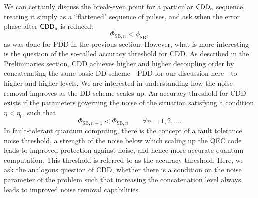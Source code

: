 \documentclass[b5paper,11pt]{article}
\newcommand{\CDDn}{\textsf{CDD\textsubscript{n}}}
\begin{document}



We can certainly discuss the break-even point for a particular $\CDDn$ sequence, treating it simply as a ``flattened" sequence of pulses, and ask when the error phase after $\CDDn$ is reduced:
\begin{equation}
 \Phi_{\mathrm{SB},n} < \phi_{\mathrm{SB}},
\end{equation}
 as was done for PDD in the previous section. 
However, what is more interesting is the question of the so-called accuracy threshold for CDD.
As described in the Preliminaries section, CDD achieves higher and higher decoupling order by concatenating the same basic DD scheme---PDD for our discussion here---to higher and higher levels. 
We are interested in understanding how the noise removal improves as the DD scheme scales up.  An accuracy threshold for CDD exists if the parameters governing the noise of the situation satisfying a condition $\eta<\eta_0$, such that 
\begin{equation}\label{eq:thresCond}
\Phi_{\mathrm{SB},n+1} < \Phi_{\mathrm{SB},n}\qquad\forall n=1,2,\ldots.
\end{equation}
In fault-tolerant quantum computing, there is the concept of a fault tolerance noise threshold, a strength of the noise below which scaling up the QEC code leads to improved protection against noise, and hence more accurate quantum computation. This threshold is referred to as the accuracy threshold. Here, we ask the analogous question of CDD, whether there is a condition on the noise parameter of the problem such that increasing the concatenation level always leads to improved noise removal capabilities. 
%
\end{document}
